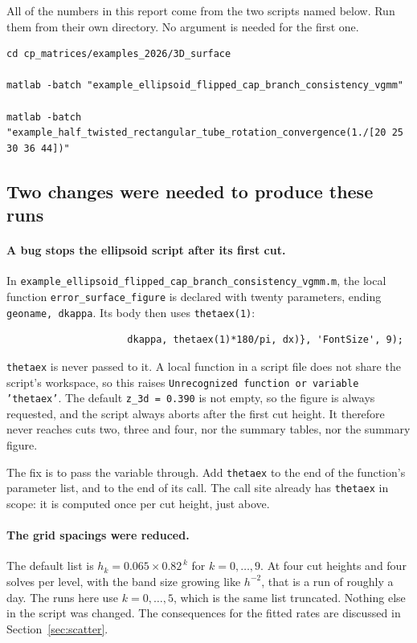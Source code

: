 All of the numbers in this report come from the two scripts named below.
Run them from their own directory. No argument is needed for the first
one.

\begin{verbatim}
cd cp_matrices/examples_2026/3D_surface

matlab -batch "example_ellipsoid_flipped_cap_branch_consistency_vgmm"

matlab -batch "example_half_twisted_rectangular_tube_rotation_convergence(1./[20 25 30 36 44])"
\end{verbatim}

\subsection{Two changes were needed to produce these runs}

\paragraph{A bug stops the ellipsoid script after its first cut.} In
\texttt{example\_ellipsoid\_flipped\_cap\_branch\_consistency\_vgmm.m},
the local function \texttt{error\_surface\_figure} is declared with
twenty parameters, ending \texttt{geoname, dkappa}. Its body then uses
\texttt{thetaex(1)}:

\begin{verbatim}
                     dkappa, thetaex(1)*180/pi, dx)}, 'FontSize', 9);
\end{verbatim}

\texttt{thetaex} is never passed to it. A local function in a script file
does not share the script's workspace, so this raises
\texttt{Unrecognized function or variable 'thetaex'}. The default
\texttt{z\_3d = 0.390} is not empty, so the figure is always requested,
and the script always aborts after the first cut height. It therefore
never reaches cuts two, three and four, nor the summary tables, nor the
summary figure.

The fix is to pass the variable through. Add \texttt{thetaex} to the end
of the function's parameter list, and to the end of its call. The call
site already has \texttt{thetaex} in scope: it is computed once per cut
height, just above.

\paragraph{The grid spacings were reduced.} The default list is
$h_k = 0.065\times 0.82^{\,k}$ for $k=0,\dots,9$. At four cut heights and
four solves per level, with the band size growing like $h^{-2}$, that is
a run of roughly a day. The runs here use $k=0,\dots,5$, which is the
same list truncated. Nothing else in the script was changed. The
consequences for the fitted rates are discussed in
Section~\ref{sec:scatter}.

